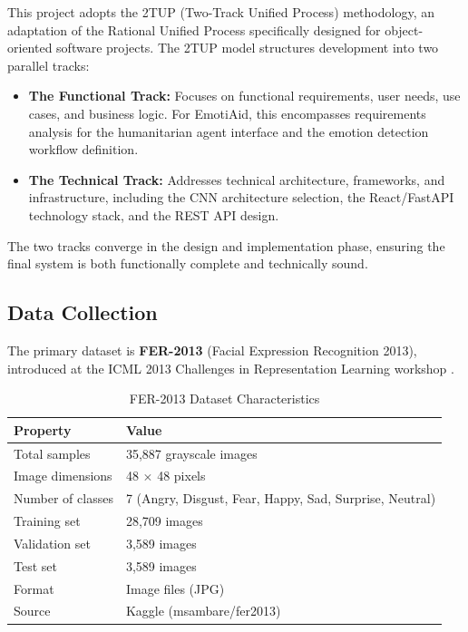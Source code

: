 \documentclass[a4paper,12pt,oneside]{report}
\begin{document}
This project adopts the 2TUP (Two-Track Unified Process) methodology, an
adaptation of the Rational Unified Process specifically designed for
object-oriented software projects. The 2TUP model structures development into
two parallel tracks:

\begin{itemize}
    \item \textbf{The Functional Track:} Focuses on functional requirements, user
    needs, use cases, and business logic. For EmotiAid, this encompasses
    requirements analysis for the humanitarian agent interface and the emotion
    detection workflow definition.
    \item \textbf{The Technical Track:} Addresses technical architecture,
    frameworks, and infrastructure, including the CNN architecture selection, the
    React/FastAPI technology stack, and the REST API design.
\end{itemize}

The two tracks converge in the design and implementation phase, ensuring the final
system is both functionally complete and technically sound.

\subsection{Data Collection}

The primary dataset is \textbf{FER-2013} (Facial Expression Recognition 2013),
introduced at the ICML 2013 Challenges in Representation Learning workshop
\cite{goodfellow2013}.

\begin{table}[H]
\centering
\caption{FER-2013 Dataset Characteristics}
\begin{tabular}{|l|l|}
\hline
\textbf{Property} & \textbf{Value} \\
\hline
Total samples & 35,887 grayscale images \\
\hline
Image dimensions & 48 $\times$ 48 pixels \\
\hline
Number of classes & 7 (Angry, Disgust, Fear, Happy, Sad, Surprise, Neutral) \\
\hline
Training set & 28,709 images \\
\hline
Validation set & 3,589 images \\
\hline
Test set & 3,589 images \\
\hline
Format & Image files (JPG) \\
\hline
Source & Kaggle (msambare/fer2013) \\
\hline
\end{tabular}
\label{tab:fer2013}
\end{table}
\end{document}
